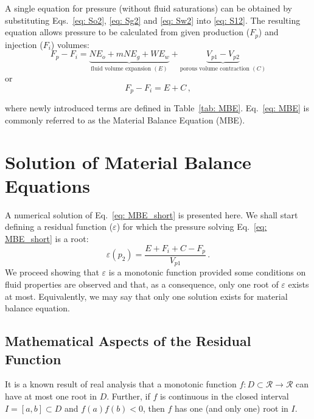 \documentclass[authoryear,preprint,review,12pt]{elsarticle}
\begin{document}
A single equation for pressure (without fluid saturations) can be obtained by substituting Eqs.~\eqref{eq: So2}, \eqref{eq: Sg2} and \eqref{eq: Sw2} into \eqref{eq: S12}. The resulting equation allows pressure to be calculated from given production ($F_p$) and injection ($F_i$) volumes:
\begin{equation}\label{eq: MBE}
F_p - F_i= \underbrace{N E_o + mN E_g + W E_w}_{\text{fluid volume expansion } (E)} +\underbrace{V_{p1}-V_{p2}}_{\text{porous volume contraction } (C)}
\end{equation}
or
\begin{equation}\label{eq: MBE_short}
F_p - F_i= E + C \, ,
\end{equation}

where newly introduced terms are defined in Table~\ref{tab: MBE}. Eq.~\eqref{eq: MBE} is commonly referred to as the Material Balance Equation (MBE).

\section{Solution of Material Balance Equations}
A numerical solution of Eq.~\eqref{eq: MBE_short} is presented here. We shall start defining a residual function ($\varepsilon$) for which the pressure solving Eq.~\eqref{eq: MBE_short} is a root:
\begin{equation}\label{eq: residual}
\varepsilon(p_2) = \frac{E+F_i+C-F_p}{V_{p1}} \, .
\end{equation}
We proceed showing that $\varepsilon$ is a monotonic function provided some conditions on fluid properties are observed and that, as a consequence, only one root of $\varepsilon$ exists at most. Equivalently, we may say that only one solution exists for material balance equation.


\subsection{Mathematical Aspects of the Residual Function}

It is a known result of real analysis that a monotonic function $f:D\subset\mathcal{R}\rightarrow\mathcal{R}$ can have at most one root in $D$. Further, if $f$ is continuous in the closed interval $I=[a,b] \subset D$ and $f(a)f(b)<0$, then $f$ has one (and only one) root in $I$.
\end{document}
